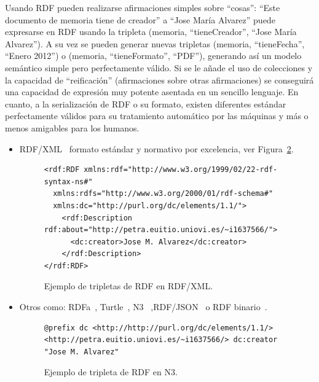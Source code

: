 Usando RDF pueden realizarse afirmaciones simples sobre ``cosas'': ``Este
documento de memoria tiene de creador'' a ``Jose María Alvarez'' puede expresarse en
RDF usando la tripleta (memoria, ``tieneCreador'', ``Jose María Alvarez''). 
A su vez  se pueden generar nuevas tripletas (memoria, ``tieneFecha'',
``Enero 2012'') o (memoria, ``tieneFormato'', ``PDF''), generando así un
modelo semántico simple pero perfectamente válido. Si se le añade el uso de colecciones y 
la capacidad de ``reificación'' (afirmaciones sobre otras
afirmaciones) se conseguirá una capacidad de expresión muy potente asentada en un
sencillo lenguaje. En cuanto, a la serialización de RDF o su formato, existen diferentes estándar
perfectamente válidos para su tratamiento automático por las máquinas y más o
menos amigables para los humanos. 
\begin{itemize}
  \item \gls{RDF/XML}~\cite{rdf-syntax} formato estándar y normativo por excelencia, ver Figura~\ref{fig:rdf-n3}. 
\begin{figure}[!htbp]
\centering
  \begin{lstlisting} 
<rdf:RDF xmlns:rdf="http://www.w3.org/1999/02/22-rdf-syntax-ns#"
  xmlns:rdfs="http://www.w3.org/2000/01/rdf-schema#"
  xmlns:dc="http://purl.org/dc/elements/1.1/">
    <rdf:Description rdf:about="http://petra.euitio.uniovi.es/~i1637566/">
      <dc:creator>Jose M. Alvarez</dc:creator>
    </rdf:Description>
</rdf:RDF>  
  \end{lstlisting} 
\caption{Ejemplo de tripletas de RDF en RDF/XML.}
\label{fig:rdf-n3}
\end{figure}  

\item Otros como: \gls{RDFa}~\cite{rdfa-primer}, \gls{Turtle}~\cite{turtle-syntax}, \gls{N3}~\cite{n3-syntax} ,\gls{RDF}/\gls{JSON}~\cite{rdf-json} o RDF binario~\cite{rdf-binario}.   
\begin{figure}[!htbp]
\centering
  \begin{lstlisting} 
@prefix dc <http://http://purl.org/dc/elements/1.1/>
<http://petra.euitio.uniovi.es/~i1637566/> dc:creator "Jose M. Alvarez"
  \end{lstlisting}
\caption{Ejemplo de tripleta de RDF en N3.}
\label{fig:rdf-n3}
\end{figure}


 \end{itemize}

